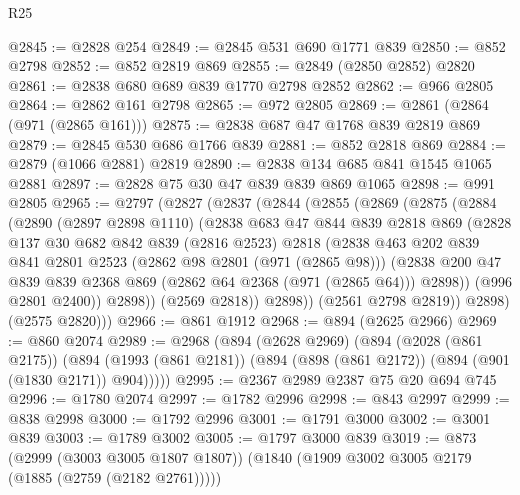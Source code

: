 \begin{lexlean}{R25}
\begin{coremodule}
@2845 := @2828 @254
@2849 := @2845 @531 @690 @1771 @839
@2850 := @852 @2798
@2852 := @852 @2819 @869
@2855 := @2849 (@2850 @2852) @2820
@2861 := @2838 @680 @689 @839 @1770 @2798 @2852
@2862 := @966 @2805
@2864 := @2862 @161 @2798
@2865 := @972 @2805
@2869 := @2861 (@2864 (@971 (@2865 @161)))
@2875 := @2838 @687 @47 @1768 @839 @2819 @869
@2879 := @2845 @530 @686 @1766 @839
@2881 := @852 @2818 @869
@2884 := @2879 (@1066 @2881) @2819
@2890 := @2838 @134 @685 @841 @1545 @1065 @2881
@2897 := @2828 @75 @30 @47 @839 @839 @869 @1065
@2898 := @991 @2805
@2965 := @2797
    (@2827
      (@2837
        (@2844
          (@2855
            (@2869
              (@2875
                (@2884
                  (@2890
                    (@2897 @2898 @1110)
                    (@2838
                      @683
                      @47
                      @844
                      @839
                      @2818
                      @869
                      (@2828
                        @137
                        @30
                        @682
                        @842
                        @839
                        (@2816 @2523)
                        @2818
                        (@2838
                          @463
                          @202
                          @839
                          @841
                          @2801
                          @2523
                          (@2862 @98 @2801 (@971 (@2865 @98)))
                          (@2838
                            @200
                            @47
                            @839
                            @839
                            @2368
                            @869
                            (@2862 @64 @2368 (@971 (@2865 @64)))
                            @2898))
                        (@996 @2801 @2400))
                      @2898))
                  (@2569 @2818))
                @2898))
            (@2561 @2798 @2819))
          @2898)
        (@2575 @2820)))
@2966 := @861 @1912
@2968 := @894 (@2625 @2966)
@2969 := @860 @2074
@2989 := @2968
    (@894
      (@2628 @2969)
      (@894
        (@2028 (@861 @2175))
        (@894 (@1993 (@861 @2181)) (@894 (@898 (@861 @2172)) (@894 (@901 (@1830 @2171)) @904)))))
@2995 := @2367 @2989 @2387 @75 @20 @694 @745
@2996 := @1780 @2074
@2997 := @1782 @2996
@2998 := @843 @2997
@2999 := @838 @2998
@3000 := @1792 @2996
@3001 := @1791 @3000
@3002 := @3001 @839
@3003 := @1789 @3002
@3005 := @1797 @3000 @839
@3019 := @873
    (@2999 (@3003 @3005 @1807 @1807))
    (@1840 (@1909 @3002 @3005 @2179 (@1885 (@2759 (@2182 @2761)))))

\end{coremodule}
\end{lexlean}
